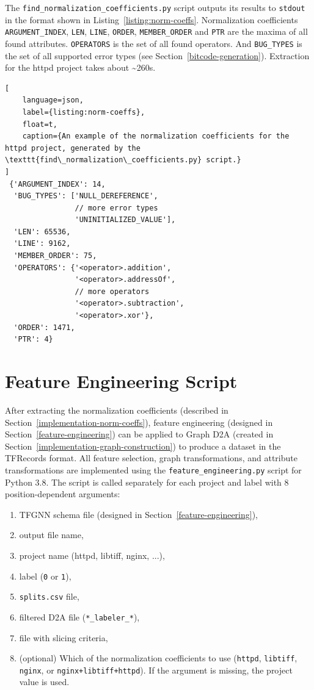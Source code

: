 The \texttt{find\_normalization\_coefficients.py} script outputs its results to \texttt{stdout} in the format shown in Listing~\ref{listing:norm-coeffs}. Normalization coefficients \texttt{ARGUMENT\_INDEX}, \texttt{LEN}, \texttt{LINE}, \texttt{ORDER}, \texttt{MEMBER\_ORDER} and \texttt{PTR} are the maxima of all found attributes. \texttt{OPERATORS} is the set of all found operators. And \texttt{BUG\_TYPES} is the set of all supported error types (see Section~\ref{bitcode-generation}). Extraction for the httpd project takes about \textasciitilde260s.


\begin{lstlisting}[
    language=json, 
    label={listing:norm-coeffs}, 
    float=t,
    caption={An example of the normalization coefficients for the httpd project, generated by the \texttt{find\_normalization\_coefficients.py} script.}
]
 {'ARGUMENT_INDEX': 14,
  'BUG_TYPES': ['NULL_DEREFERENCE',
                // more error types
                'UNINITIALIZED_VALUE'],
  'LEN': 65536,
  'LINE': 9162,
  'MEMBER_ORDER': 75,
  'OPERATORS': {'<operator>.addition',
                '<operator>.addressOf',
                // more operators
                '<operator>.subtraction',
                '<operator>.xor'},
  'ORDER': 1471,
  'PTR': 4}
\end{lstlisting}


\section{Feature Engineering Script}
\label{implementation-feature-engineering}
After extracting the normalization coefficients (described in Section~\ref{implementation-norm-coeffs}), feature engineering (designed in Section~\ref{feature-engineering}) can be applied to Graph D2A (created in Section~\ref{implementation-graph-construction}) to produce a dataset in the TFRecords format. All feature selection, graph transformations, and attribute transformations are implemented using the \texttt{feature\_engineering.py} script for Python 3.8. The script is called separately for each project and label with 8 position-dependent arguments:
\begin{enumerate}
    \item TFGNN schema file (designed in Section~\ref{feature-engineering}),
    \item output file name,
    \item project name (httpd, libtiff, nginx, ...),
    \item label (\texttt{0} or \texttt{1}),
    \item \texttt{splits.csv} file,
    \item filtered D2A file (\texttt{*\_labeler\_*}),
    \item file with slicing criteria,
    \item (optional) Which of the normalization coefficients to use (\texttt{httpd}, \texttt{libtiff}, \texttt{nginx}, or \texttt{nginx+libtiff+httpd}). If the argument is missing, the project value is used.
\end{enumerate}

